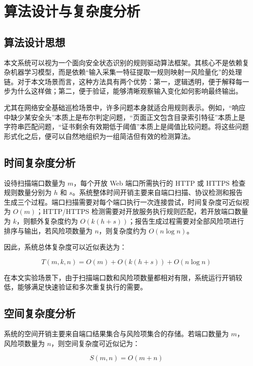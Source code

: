\documentclass[12pt,a4paper,fontset=none]{ctexart}
\begin{document}
\section{算法设计与复杂度分析}

\subsection{算法设计思想}

本文系统可以视为一个面向安全状态识别的规则驱动算法框架。其核心不是依赖复杂机器学习模型，而是依赖“输入采集一特征提取一规则映射一风险量化”的处理链。对于本文场景而言，这种方法具有两个优势：第一，逻辑透明，便于解释每一步为什么这样做；第二，便于验证，能够清晰观察输入变化如何影响最终输出。

尤其在网络安全基础巡检场景中，许多问题本身就适合用规则表示。例如，“响应中缺少某安全头”本质上是布尔判定问题，“页面正文包含目录索引特征”本质上是字符串匹配问题，“证书剩余有效期低于阈值”本质上是阈值比较问题。将这些问题形式化之后，便可以自然地组织为一组简洁但有效的检测算法。

\subsection{时间复杂度分析}

设待扫描端口数量为 $m$，每个开放 Web 端口所需执行的 HTTP 或 HTTPS 检查规则数量分别为 $h$ 和 $s$。系统整体时间开销主要来自端口扫描、协议检测和报告生成三个过程。端口扫描需要对每个端口执行一次连接尝试，时间复杂度可近似视为 $O(m)$；HTTP/HTTPS 检测需要对开放服务执行规则匹配，若开放端口数量为 $k$，则额外复杂度约为 $O(k(h+s))$；报告生成过程需要对全部风险项进行排序与输出，若风险项数量为 $n$，则复杂度约为 $O(n \log n)$。

因此，系统总体复杂度可以近似表达为：

\begin{equation}
T(m, k, n) = O(m) + O(k(h+s)) + O(n \log n)
\end{equation}

在本文实验场景下，由于扫描端口数和风险项数量都相对有限，系统运行开销较低，能够满足快速验证和多次重复执行的需要。

\subsection{空间复杂度分析}

系统的空间开销主要来自端口结果集合与风险项集合的存储。若端口数量为 $m$，风险项数量为 $n$，则空间复杂度可近似记为：

\begin{equation}
S(m, n) = O(m+n)
\end{equation}
\end{document}

